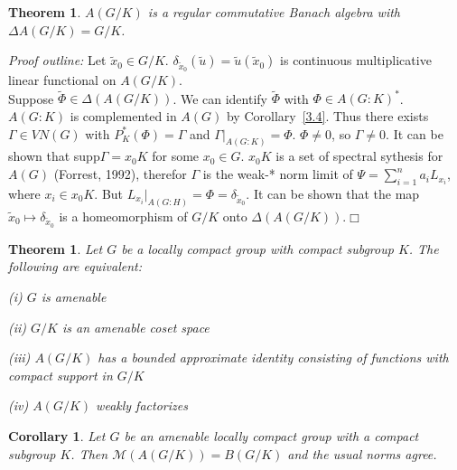 \documentclass[landscape]{slides}
\newtheorem{theorem}[defn]{Theorem}
\newtheorem{cor}[defn]{Corollary}
\begin{document}
\begin{slide}
\begin{theorem}
$A(G/K)$ is a regular commutative Banach algebra with $\Delta A(G/K) = G/K$.
\end{theorem}
{\it Proof outline:}
Let $\tilde{x}_0 \in G/K$.  $\delta_{\tilde{x}_0} (\tilde{u}) = \tilde{u}(\tilde{x}_0)$ is
continuous multiplicative linear functional on $A(G/K)$.\\
Suppose $\tilde{\Phi} \in \Delta(A(G/K))$.  We can identify $\tilde{\Phi}$ with $\Phi \in A(G:K)^*$.
$A(G:K)$ is complemented in $A(G)$ by Corollary~\ref{3.4}.  Thus there exists $\Gamma \in VN(G)$
with $P^*_K (\Phi) = \Gamma$ and $\Gamma |_{A(G:K)} = \Phi$.  $\Phi \neq 0$, so $\Gamma \neq 0$.
It can be shown that supp$\Gamma = x_0 K$ for some $x_0 \in G$.  $x_0 K$ is a set of spectral sythesis
for $A(G)$ (Forrest, 1992), therefor $\Gamma$ is the weak-* norm limit of $\Psi = \sum_{i=1}^n a_i L_{x_i}$,
where $x_i \in x_0 K$.  But $L_{x_i} |_{A(G:H)} = \Phi = \delta_{\tilde{x}_0}$.
It can be shown that the map $\tilde{x}_0 \mapsto \delta_{\tilde{x}_0}$ is a homeomorphism
of $G/K$ onto $\Delta(A(G/K))$.$\Box$
\end{slide}

\begin{slide}
\begin{theorem}\label{badlist}
Let $G$ be a locally compact group with compact subgroup $K$.  The following are equivalent:
\begin{list}{}{\topsep -4pt \itemsep -4pt}
\item[(i)] $G$ is amenable
\item[(ii)] $G/K$ is an amenable coset space
\item[(iii)] $A(G/K)$ has a bounded approximate identity consisting of functions with compact support in $G/K$
\item[(iv)] $A(G/K)$ weakly factorizes
\end{list}
\end{theorem}

\begin{cor}
Let $G$ be an amenable locally compact group with a compact subgroup $K$.  Then
${\mathcal M}(A(G/K)) = B(G/K)$ and the usual norms agree.
\end{cor}
\end{slide}
\end{document}

